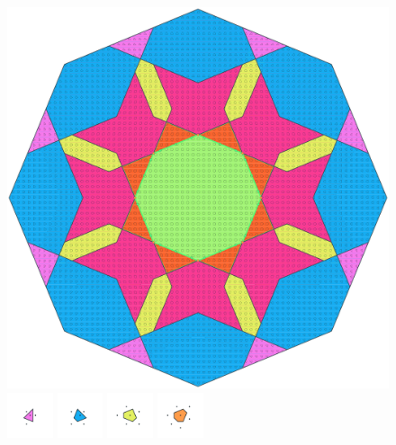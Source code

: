 \documentclass[text.tex]{subfiles}
\begin{document}
\clearpage
\pagestyle{fancy}
\fancyhf{}
\begin{figure}[h!]
\centering
\includegraphics[width=1\textwidth]{img/results/octagon/octagon_150000_(3_0alpha_2).pdf}
\includegraphics[width=0.12\textwidth]{img/results/octagon/octagon_150000_(3_0alpha_2)_001.pdf}
\includegraphics[width=0.12\textwidth]{img/results/octagon/octagon_150000_(3_0alpha_2)_002.pdf}
\includegraphics[width=0.12\textwidth]{img/results/octagon/octagon_150000_(3_0alpha_2)_003.pdf}
\includegraphics[width=0.12\textwidth]{img/results/octagon/octagon_150000_(3_0alpha_2)_004.pdf}

\end{figure}
\end{document}
